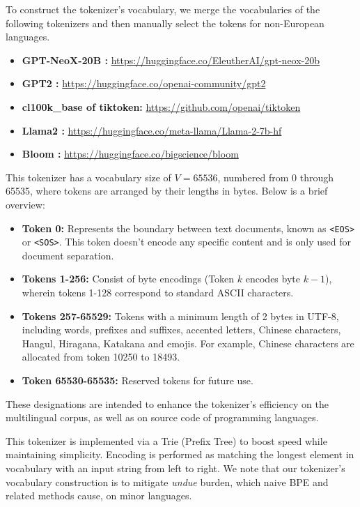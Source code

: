 To construct the tokenizer's vocabulary, we merge the vocabularies of the following tokenizers and then manually select the tokens for non-European languages.

\begin{itemize}
    \item \textbf{GPT-NeoX-20B \citep{black-etal-2022-gpt}:} \url{https://huggingface.co/EleutherAI/gpt-neox-20b}
    \item \textbf{GPT2 \citep{radford2019language}:} \url{https://huggingface.co/openai-community/gpt2}
    \item \textbf{cl100k\_base of tiktoken:} \url{https://github.com/openai/tiktoken}
    \item \textbf{Llama2 \citep{touvron2023llama}:} \url{https://huggingface.co/meta-llama/Llama-2-7b-hf}
    \item \textbf{Bloom \citep{workshop2023bloom}:} \url{https://huggingface.co/bigscience/bloom}
\end{itemize}

This tokenizer has a vocabulary size of $V=65536$, numbered from 0 through 65535, where tokens are arranged by their lengths in bytes. Below is a brief overview:

\begin{itemize}
    \item \textbf{Token 0:} Represents the boundary between text documents, known as \texttt{<EOS>} or \texttt{<SOS>}. This token doesn't encode any specific content and is only used for document separation.
    \item \textbf{Tokens 1-256:} Consist of byte encodings (Token $k$ encodes byte $k-1$), wherein tokens 1-128 correspond to standard ASCII characters.
    \item \textbf{Tokens 257-65529:} Tokens with a minimum length of 2 bytes in UTF-8, including words, prefixes and suffixes, accented letters, Chinese characters, Hangul, Hiragana, Katakana and emojis. For example, Chinese characters are allocated from token 10250 to 18493.
    \item \textbf{Token 65530-65535:} Reserved tokens for future use.
\end{itemize}

These designations are intended to enhance the tokenizer's efficiency on the multilingual corpus, as well as on source code of programming languages.

This tokenizer is implemented via a Trie (Prefix Tree) to boost speed while maintaining simplicity. Encoding is performed as matching the longest element in vocabulary with an input string from left to right. We note that our tokenizer's vocabulary construction is to mitigate \textit{undue} burden, which naive BPE and related methods cause, on minor languages.

